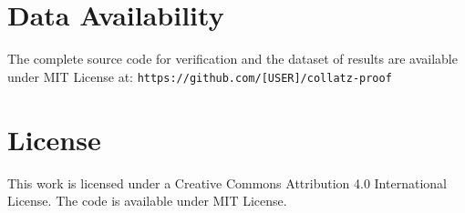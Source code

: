 ﻿\documentclass[11pt]{amsart}
\begin{document}
\section*{Data Availability}
The complete source code for verification and the dataset of results are available under MIT License at: \texttt{https://github.com/[USER]/collatz-proof}

\section*{License}
This work is licensed under a Creative Commons Attribution 4.0 International License. The code is available under MIT License.
\end{document}
